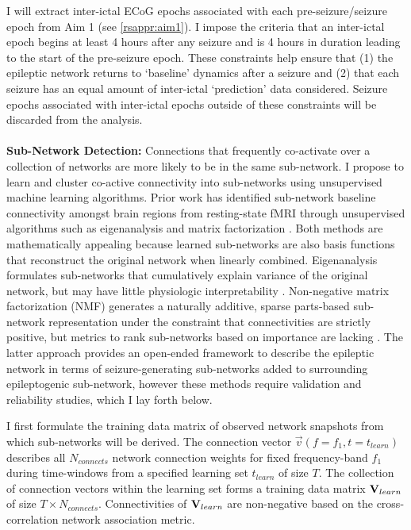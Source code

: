 I will extract inter-ictal ECoG epochs associated with each pre-seizure/seizure epoch from Aim 1 (see \ref{rsappr:aim1}). I impose the criteria that an inter-ictal epoch begins at least 4 hours after any seizure and is 4 hours in duration leading to the start of the pre-seizure epoch. These constraints help ensure that (1) the epileptic network returns to `baseline' dynamics after a seizure and (2) that each seizure has an equal amount of inter-ictal `prediction' data considered. Seizure epochs associated with inter-ictal epochs outside of these constraints will be discarded from the analysis.
~\\
~\\
\textbf{Sub-Network Detection:}
Connections that frequently co-activate over a collection of networks are more likely to be in the same sub-network. I propose to learn and cluster co-active connectivity into sub-networks using unsupervised machine learning algorithms. Prior work has identified sub-network baseline connectivity amongst brain regions from resting-state fMRI through unsupervised algorithms such as eigenanalysis \cite{leonardi2013principal} and matrix factorization \cite{eavani2013identifying,eavani2013unsupervised}. Both methods are mathematically appealing because learned sub-networks are also basis functions that reconstruct the original network when linearly combined. Eigenanalysis formulates sub-networks that cumulatively explain variance of the original network, but may have little physiologic interpretability \cite{ghanbari2013connectivity}. Non-negative matrix factorization (NMF) generates a naturally additive, sparse parts-based sub-network representation under the constraint that connectivities are strictly positive, but metrics to rank sub-networks based on importance are lacking \cite{ghanbari2013connectivity}. The latter approach provides an open-ended framework to describe the epileptic network in terms of seizure-generating sub-networks added to surrounding epileptogenic sub-network, however these methods require validation and reliability studies, which I lay forth below.

I first formulate the training data matrix of observed network snapshots from which sub-networks will be derived. The connection vector $\vec{v}(f=f_1,t=t_{learn})$ describes all $N_{connects}$ network connection weights for fixed frequency-band $f_1$ during time-windows from a specified learning set $t_{learn}$ of size $T$. The collection of connection vectors within the learning set forms a training data matrix $\mathbf{\displaystyle V}_{learn}$ of size $T \times N_{connects}$. Connectivities of $\mathbf{\displaystyle V}_{learn}$ are non-negative based on the cross-correlation network association metric.

